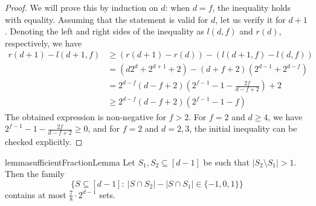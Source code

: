 \begin{proof}
    We will prove this by induction on $d$: when $d=f$, the inequality holds with equality. Assuming that the statement is valid for $d$, let us verify it for  $d+1$. Denoting the left and right sides of the inequality as $l(d, f)$ and $r(d)$, respectively, we have
    \begin{equation*}
        \begin{split}
            r(d+1) - l(d+1, f) 
            & \geq \left(r(d+1) - r(d)\right) - \left(l(d+1, f) - l(d, f)\right) \\
            & = \left(d2^d + 2^{d+1} + 2\right) - \left(d+f+2\right)\left(2^{d-1}+2^{d-f}\right) \\
            & = 2^{d-f}\left(d-f+2\right)\left(2^{f-1}-1-\frac{2f}{d-f+2}\right)+2 \\
            & \geq 2^{d-f}\left(d-f+2\right)\left(2^{f-1}-1-f\right)
        \end{split}
    \end{equation*}
    The obtained expression is non-negative for $f>2$. For $f=2$ and $d\geq4$, we have $2^{f-1}-1-\frac{2f}{d-f+2}\geq0$, and for $f=2$ and $d=2,3$, the initial inequality can be checked explicitly.    
\end{proof}

\begin{restatable}[]{lemma}{sufficientFractionLemma}\label{78sufficientLemma}
    Let $S_1, S_2 \subseteq [d-1]$ be such that $|S_2 \setminus S_1| > 1$. Then the family 
    \[
        \bigl\{S \subseteq [d-1]:\: |S\cap S_2|-|S\cap S_1| \in \{-1, 0, 1\}\bigr\}
    \]
    contains at most $\frac{7}{8}\cdot 2^{d-1}$ sets. 
\end{restatable}

